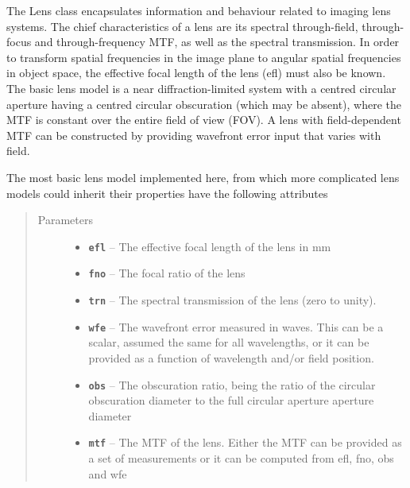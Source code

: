 \documentclass[a4paper,10pt,english]{sphinxmanual}
\begin{document}
\begin{fulllineitems}
\label{packages:optics.Lens}
The Lens class encapsulates information and behaviour related to imaging lens systems.
The chief characteristics of a lens are its spectral through-field, through-focus and
through-frequency MTF, as well as the spectral transmission.
In order to transform spatial frequencies in the image plane to angular spatial frequencies
in object space, the effective focal length of the lens (efl) must also be known.
The basic lens model is a near diffraction-limited system with a centred circular aperture
having a centred circular obscuration (which may be absent), where the MTF is constant over
the entire field of view (FOV). A lens with field-dependent MTF can be constructed by
providing wavefront error input that varies with field.

The most basic lens model implemented here, from which more complicated lens models could inherit
their properties have the following attributes
\begin{quote}\begin{description}
\item[{Parameters}] \leavevmode\begin{itemize}
\item {} 
\textbf{\texttt{efl}} -- The effective focal length of the lens in mm

\item {} 
\textbf{\texttt{fno}} -- The focal ratio of the lens

\item {} 
\textbf{\texttt{trn}} -- The spectral transmission of the lens (zero to unity).

\item {} 
\textbf{\texttt{wfe}} -- The wavefront error measured in waves. This can be a scalar, assumed the same for
all wavelengths, or it can be provided as a function of wavelength and/or field position.

\item {} 
\textbf{\texttt{obs}} -- The obscuration ratio, being the ratio of the circular obscuration diameter to the
full circular aperture aperture diameter

\item {} 
\textbf{\texttt{mtf}} -- The MTF of the lens. Either the MTF can be provided as a set of measurements or it can be
computed from efl, fno, obs and wfe


\end{itemize}
\end{description}
\end{quote}
\end{fulllineitems}
\end{document}
